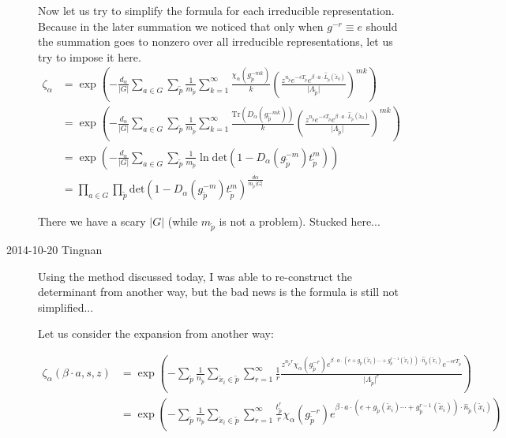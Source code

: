 \begin{description}
Now let us try to simplify the formula for each irreducible representation. Because in the later summation we noticed that only when $g^{-r}\equiv e$ should the summation goes to nonzero over all irreducible representations, let us try to impose it here. 
\begin{align*}
\zeta_{\alpha} & =\exp\left(-\frac{d_{\alpha}}{\vert G\vert}\sum_{a\in G}\sum_{\tilde{p}}\frac{1}{m_{\tilde{p}}}\sum_{k=1}^{\infty}\frac{\chi_{\alpha}(g_{\tilde{p}}^{-mk})}{k}\left(\frac{z^{n_{\tilde{p}}}e^{-sT_{\tilde{p}}}e^{\beta\cdot a\cdot\hat{L}_{\tilde{p}}(\tilde{x}_{0})}}{\vert\Lambda_{\tilde{p}}\vert}\right)^{mk}\right)\\
 & =\exp\left(-\frac{d_{\alpha}}{\vert G\vert}\sum_{a\in G}\sum_{\tilde{p}}\frac{1}{m_{\tilde{p}}}\sum_{k=1}^{\infty}\frac{\mathrm{Tr}(D_{\alpha}(g_{\tilde{p}}^{-mk}))}{k}\left(\frac{z^{n_{\tilde{p}}}e^{-sT_{\tilde{p}}}e^{\beta\cdot a\cdot\hat{L}_{\tilde{p}}(\tilde{x}_{0})}}{\vert\Lambda_{\tilde{p}}\vert}\right)^{mk}\right)\\
 & =\exp\left(-\frac{d_{\alpha}}{\vert G\vert}\sum_{a\in G}\sum_{\tilde{p}}\frac{1}{m_{\tilde{p}}}\ln\mathrm{det}\left(1-D_{\alpha}(g_{\tilde{p}}^{-m})t_{\tilde{p}}^{m}\right)\right)\\
 & =\prod_{a\in G}\prod_{\tilde{p}}\mathrm{det}\left(1-D_{\alpha}(g_{\tilde{p}}^{-m})t_{\tilde{p}}^{m}\right)^{\frac{d\alpha}{m_{\tilde{p}}\vert G\vert}}
\end{align*}

There we have a scary $\vert G\vert$ (while $m_{\tilde{p}}$ is not a problem). Stucked here...

\item[2014-10-20 Tingnan]

Using the method discussed today, I was able to re-construct the determinant from another way, but the bad news is the formula is still not simplified...


Let us consider the expansion from another way:

\begin{align*}
\zeta_{\alpha}(\beta\cdot a,s,z) & =\exp\left(-\sum_{\tilde{p}}\frac{1}{n_{\tilde{p}}}\sum_{\tilde{x}_{i}\in\tilde{p}}\sum_{r=1}^{\infty}\frac{1}{r}\frac{z^{n_{\tilde{p}}r}\chi_{\alpha}(g_{\tilde{p}}^{-r})e^{\beta\cdot a\cdot(e+g_{\tilde{p}}(\tilde{x}_{i})\cdots+g_{\tilde{p}}^{r-1}(\tilde{x}_{i}))\cdot\hat{n}_{\tilde{p}}(\tilde{x}_{i})}e^{-srT_{\tilde{p}}}}{\vert\Lambda_{\tilde{p}}\vert^{r}}\right)\\
 & =\exp\left(-\sum_{\tilde{p}}\frac{1}{n_{\tilde{p}}}\sum_{\tilde{x}_{i}\in\tilde{p}}\sum_{r=1}^{\infty}\frac{t_{\tilde{p}}^{r}}{r}\chi_{\alpha}(g_{\tilde{p}}^{-r})e^{\beta\cdot a\cdot(e+g_{\tilde{p}}(\tilde{x}_{i})\cdots+g_{\tilde{p}}^{r-1}(\tilde{x}_{i}))\cdot\hat{n}_{\tilde{p}}(\tilde{x}_{i})}\right)
\end{align*}



\end{description}
